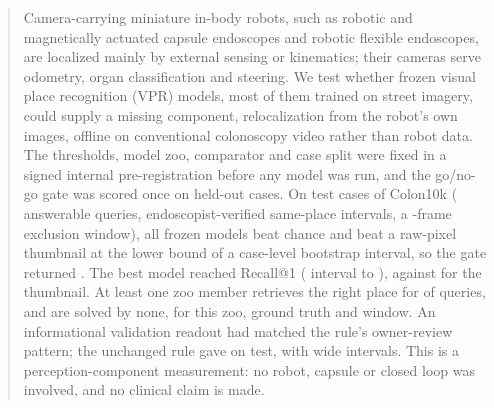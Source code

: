 \begin{abstract}
Camera-carrying miniature in-body robots, such as robotic and magnetically
actuated capsule endoscopes and robotic flexible endoscopes, are localized
mainly by external sensing or kinematics; their cameras serve
odometry, organ classification and steering. We test whether frozen visual
place recognition (VPR) models, most of them trained on street imagery, could
supply a missing component, relocalization from the robot's own images,
offline on conventional colonoscopy video rather than robot data. The
thresholds, model zoo,
comparator and case split were fixed in a signed internal pre-registration
before any model was run, and the go/no-go gate was scored once on held-out
cases. On  test cases of Colon10k ( answerable
queries, endoscopist-verified same-place intervals, a
-frame exclusion window), all  frozen models
beat chance and  beat a raw-pixel thumbnail at the lower
bound of a case-level bootstrap interval, so the gate returned
\texttt{}. The best model reached Recall@1
 ( interval  to
), against  for the thumbnail. At least
one zoo member retrieves the right place for  of queries, and
 are solved by none, for this zoo, ground truth and window. An
informational validation readout had matched the rule's owner-review
pattern; the unchanged rule gave \texttt{} on test, with
wide intervals. This is a perception-component measurement: no robot,
capsule or closed loop was involved, and no clinical claim is made.

\end{abstract}
